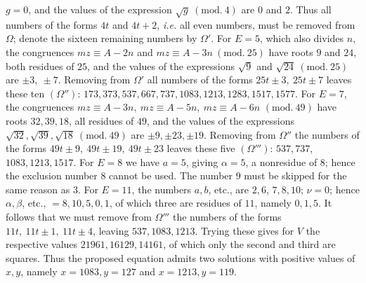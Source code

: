 \(g=0\), and the values of the expression \(\surd{g}\ (\mathrm{mod.}\ 4)\) are \(0\) and \(2\). Thus all numbers of the forms \(4t\) and \(4t+2\), \textit{i.e.} all even numbers, must be removed from \(\Omega\); denote the sixteen remaining numbers by \(\Omega'\). For \(E=5\), which also divides \(n\), the congruences \(mz\equiv A-2n\) and \(mz\equiv A-3n\ (\mathrm{mod.}\ 25)\) have roots \(9\) and \(24\), both residues of \(25\), and the values of the expressions \(\surd9\) and \(\surd{24}\ (\mathrm{mod.}\ 25)\) are \(\pm3,\allowbreak \ \pm7\). Removing from \(\Omega'\) all numbers of the forms \(25t\pm3,\allowbreak \ 25t\pm7\) leaves these ten \((\Omega'')\): \(173,\allowbreak 373,\allowbreak 537,\allowbreak 667,\allowbreak 737,\allowbreak 1083,\allowbreak 1213,\allowbreak 1283,\allowbreak 1517,\allowbreak 1577\). For \(E=7\), the congruences \(mz\equiv A-3n,\allowbreak \ mz\equiv A-5n,\allowbreak \ mz\equiv A-6n\) \((\mathrm{mod.}\ 49)\) have roots \(32,\allowbreak 39,\allowbreak 18\), all residues of \(49\), and the values of the expressions \(\surd{32},\allowbreak \surd{39},\allowbreak \surd{18}\ (\mathrm{mod.}\ 49)\) are \(\pm9,\allowbreak \pm23,\allowbreak \pm19\). Removing from \(\Omega''\) the numbers of the forms \(49t\pm9,\allowbreak \ 49t\pm19,\allowbreak \ 49t\pm23\) leaves these five \((\Omega''')\): \(537,\allowbreak 737\), \(1083,\allowbreak 1213,\allowbreak 1517\). For \(E=8\) we have \(a=5\), giving \(\alpha=5\), a nonresidue of \(8\); hence the exclusion number \(8\) cannot be used. The number \(9\) must be skipped for the same reason as \(3\). For \(E=11\), the numbers \(a,\allowbreak b\), etc., are \(2,\allowbreak 6\), \(7,\allowbreak 8,\allowbreak 10\); \(\nu=0\); hence \(\alpha,\allowbreak \beta\), etc., \(=8,\allowbreak 10,\allowbreak 5,\allowbreak 0,\allowbreak 1\), of which three are residues of \(11\), namely \(0,\allowbreak 1,\allowbreak 5\). It follows that we must remove from \(\Omega'''\) the numbers of the forms \(11t,\allowbreak \ 11t\pm1,\allowbreak \ 11t\pm4\), leaving \(537,\allowbreak 1083,\allowbreak 1213\). Trying these gives for \(V\) the respective values \(21961,\allowbreak 16129,\allowbreak 14161\), of which only the second and third are squares. Thus the proposed equation admits two solutions with positive values of \(x,\allowbreak y\), namely \(x=1083,\allowbreak y=127\) and \(x=1213,\allowbreak y=119\).

